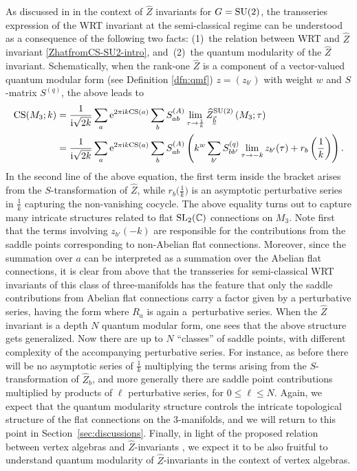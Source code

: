 \documentclass[pdftex]{sigma}
\newcommand{\Zhlong}[3]{\ensuremath{\widehat{Z}^{#1}_{#2}\left(#3;\tau\right)}}
\def\bv{{\vec{\underline{b}}}}
\theoremstyle{definition}
\numberwithin{equation}{section}
\begin{document}
As discussed in \cite{cheng20193d} in the context of $\widehat Z$ invariants for $G={\rm SU}(2)$, the transseries expression of the WRT invariant at the semi-classical regime can be understood as a consequence of the following two facts: (1)~the relation between WRT and $\widehat Z$ invariant \eqref{ZhatfromCS-SU2-intro}, and~(2)~the quantum modularity of the $\widehat Z$ invariant. Schematically, when the rank-one $\widehat Z$ is a component of a vector-valued quantum modular form (see Definition \ref{dfn:qmf}) $z=(z_{b'})$ with weight $w$ and $S$-matrix $S^{(q)}$, the above leads to
\begin{align}
 \mathrm{CS}(M_3; k)& ={\frac{1}{{\rm i}\sqrt{2k}}} \sum_{a }{\rm e}^{2\pi {\rm i} k {\rm CS}(a)}\sum_b S^{(A)}_{ab} \lim_{\tau\to {\frac{1}{ k}}} \Zhlong{{\rm SU}(2)}{\bv}{M_3} \nonumber \\
 &={\frac{1}{{\rm i}\sqrt{2k}}}
 \sum_{a } {\rm e}^{2\pi {\rm i} k {\rm CS}(a)}\sum_b S^{(A)}_{ab} \left( k^w \sum_{b'} S^{(q)}_{bb'} \lim_{\tau\to {-k}}z_{b'}(\tau) + r_b\left(\frac{1}{ k}\right)\right).\label{CS_transseries}
\end{align}
In the second line of the above equation, the first term inside the bracket arises from the $S$-transformation of $\widehat Z$, while $r_b\bigl(\tfrac{1}{ k}\bigr)$ is an asymptotic perturbative series in $\tfrac{1}{ k}$ capturing the non-vanishing cocycle. The above equality turns out to capture many intricate structures related to flat ${\rm SL}_2({\mathbb C})$ connections on $M_3$. Note first that the terms involving $z_{b'}(-k)$ are responsible for the contributions from the saddle points corresponding to {non-Abelian} flat connections. Moreover, since the summation over $a$ can be interpreted as a summation over the Abelian flat connections, it is clear from above that the transseries for semi-classical WRT invariants of this class of three-manifolds has the feature that only the saddle contributions from Abelian flat connections carry a factor given by a perturbative series, having the form  where $R_a$ is again a~perturbative series. When the $\widehat Z$ invariant is a depth $N$ quantum modular form, one sees that the above structure gets generalized. Now there are up to $N$ ``classes'' of saddle points, with different complexity of the accompanying perturbative series. For instance, as before there will be no asymptotic series of $\tfrac{1}{k}$ multiplying the terms arising from the $S$-transformation of $\widehat Z_b$, and more generally there are saddle point contributions multiplied by products of $\ell$ perturbative series, for $0\leq \ell \leq N$. Again, we expect that the quantum modularity structure controls the intricate topological structure of the flat connections on the 3-manifolds, and we will return to this point in Section~\ref{sec:discussions}. Finally, in light of the proposed relation between vertex algebras and $\widehat Z$-invariants \cite{chengUpC,cheng20193d}, we expect it to be also fruitful to understand quantum modularity of $\widehat Z$-invariants in the context of vertex algebras.
\end{document}
